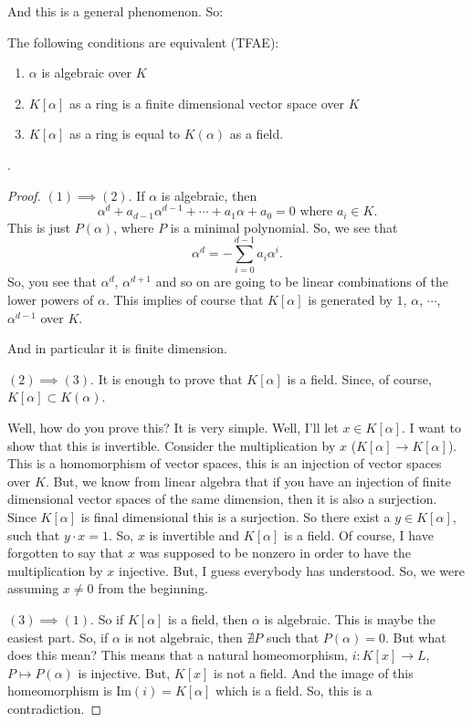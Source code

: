 And this is a general phenomenon. So:
\begin{proposition} 
\label{p1}
The following conditions are equivalent (TFAE): 
\begin{enumerate}
\item $\alpha$ is algebraic over $K$
\item $K[\alpha]$ as a ring is a finite dimensional vector space over $K$
\item $K[\alpha]$ as a ring is equal to $K(\alpha)$ as a field.
\end{enumerate}.  
\end{proposition}

\begin{proof}
$(1)\implies(2)$. If $\alpha$ is algebraic, then
\begin{equation}
\alpha^d+a_{d-1}\alpha^{d-1}+\cdots+ a_1\alpha +a_0=0\text{ where }a_i \in K.
\end{equation}
This is just $P(\alpha)$, where $P$ is a minimal polynomial. So, we see that 
\begin{equation}
\alpha ^d = - \sum_{i=0}^{d-1} a_i\alpha^i.
\end{equation}
So, you see that $\alpha^d$, $\alpha^{d+1}$ and so on are going to be linear combinations of the lower powers of $\alpha$. This implies of course that $K[\alpha]$ is generated by $1$, $\alpha$, $\cdots$, $\alpha^{d-1}$ over $K$. 

And in particular it is finite dimension. 

$(2)\implies(3)$. It is enough to prove that $K[\alpha]$ is a field. Since, of course, $K[\alpha]\subset K(\alpha)$. 

Well, how do you prove this? It is very simple. Well, I'll let $x\in K[\alpha]$. I want to show that this is invertible. Consider the multiplication by $x$ ($K[\alpha]\to K[\alpha]$). This is a homomorphism of vector spaces, this is an injection of vector spaces over $K$. But, we know from linear algebra that if you have an injection of finite dimensional vector spaces of the same dimension, then it is also a surjection. Since $K[\alpha]$ is final dimensional this is a surjection. So there exist a $y\in K[\alpha]$, such that $y\cdot x = 1$. So, $x$ is invertible and $K[\alpha]$ is a field. Of course, I have forgotten to say that $x$ was supposed to be nonzero in order to have the multiplication by $x$ injective. But, I guess everybody has understood. So, we were assuming $x\neq 0$ from the beginning.

$(3)\implies(1)$. So if $K[\alpha]$ is a field, then $\alpha$ is algebraic. This is maybe the easiest part. So, if $\alpha$ is not algebraic, then $\nexists P$ such that $P(\alpha)=0$. But what does this mean? This means that a natural homeomorphism, $i:K[x]\to L$, $P \mapsto P(\alpha)$ is injective. But, $K[x]$ is not a field. And the image of this homeomorphism is $\text{Im}(i)=K[\alpha]$ which is a field. So, this is a contradiction.
\end{proof}


